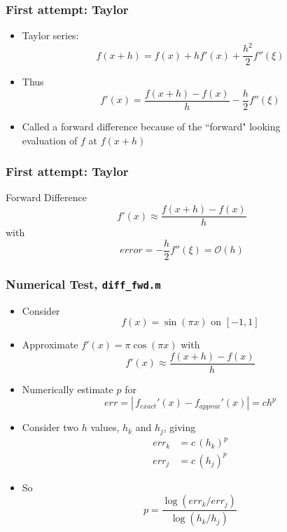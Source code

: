 \documentclass[10pt]{beamer}
\newcommand{\mO}{{\mathcal{O}}}
\begin{document}
\begin{frame}
\frametitle{First attempt: Taylor}
\begin{itemize}
    \item Taylor series:
    \begin{equation*}
      f(x+h) = f(x) + h f'(x) + \frac{h^2}{2}f''(\xi)
    \end{equation*}
    \item<2->Thus
    \begin{equation*}
      f'(x) = \frac{f(x+h)-f(x)}{h} - \frac{h}{2}f''(\xi)
    \end{equation*}
    \item<3-> Called a forward difference because of the ``forward" 
              looking\\evaluation of $f$ at $f(x+h)$
\end{itemize}
\end{frame}
\begin{frame}
\frametitle{First attempt: Taylor}
\begin{block}{Forward Difference}
\begin{equation*}
  f'(x) \approx \frac{f(x+h)-f(x)}{h}
\end{equation*}
with
\begin{equation*}
  error = - \frac{h}{2}f''(\xi) = \mO(h)
\end{equation*}
\end{block}
\end{frame}
\begin{frame}
\frametitle{Numerical Test, \texttt{diff_fwd.m}}
\begin{itemize}
    \item Consider
    \begin{equation*}
      f(x) = \sin(\pi x)\,\, \text{on}\,\, [-1,1]
    \end{equation*}
    \item Approximate $f'(x) = \pi \cos(\pi x)$ with
    \begin{equation*}
      f'(x) \approx \frac{f(x+h)-f(x)}{h}
    \end{equation*}
    \item<2-> Numerically estimate $p$ for
        \[ err = |\,f_{exact}'(x) - f_{approx}'(x)| = c h^p \]
    \item<3-> Consider two $h$ values, $h_k$ and $h_j$, giving
    \begin{align*}
      err_k & = c\, (h_k)^p\\
      err_j & = c\, (h_j)^p
    \end{align*}
    \item<4-> So
    \begin{equation*}
      p = \frac{ \log(err_k/err_j) }{ \log(h_k/h_j) }
    \end{equation*}
\end{itemize}
\end{frame}
\end{document}
